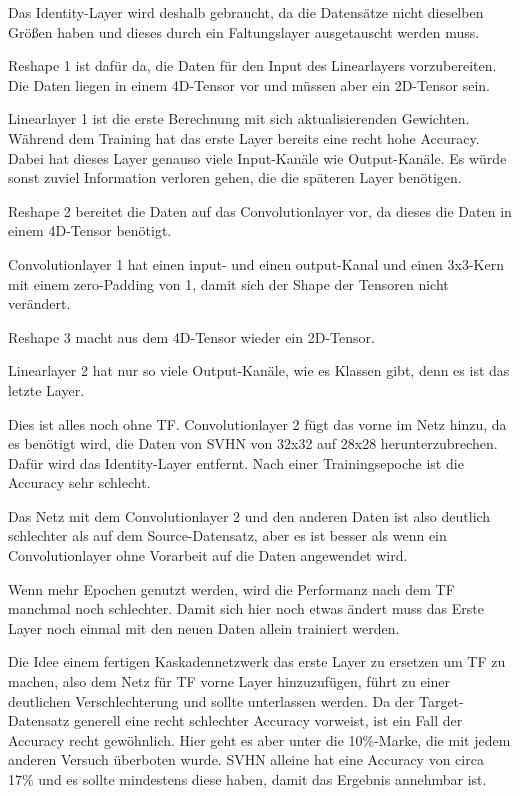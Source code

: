     Das Identity-Layer wird deshalb gebraucht, da die Datensätze nicht 
    dieselben Größen haben und dieses durch ein Faltungslayer ausgetauscht 
    werden muss.

    Reshape 1 ist dafür da, die Daten für den Input des Linearlayers vorzubereiten. 
    Die Daten liegen in einem 4D-Tensor vor und müssen aber ein 2D-Tensor sein. 

    Linearlayer 1 ist die erste Berechnung mit sich aktualisierenden Gewichten. 
    Während dem Training hat das erste Layer bereits eine recht hohe Accuracy. 
    Dabei hat dieses Layer genauso viele Input-Kanäle wie Output-Kanäle. 
    Es würde sonst zuviel Information verloren gehen, die die späteren Layer benötigen.

    Reshape 2 bereitet die Daten auf das Convolutionlayer vor, da dieses die Daten 
    in einem 4D-Tensor benötigt.

    Convolutionlayer 1 hat einen input- und einen output-Kanal und einen 3x3-Kern 
    mit einem zero-Padding von 1, damit sich der Shape der Tensoren nicht verändert. 

    Reshape 3 macht aus dem 4D-Tensor wieder ein 2D-Tensor.

    Linearlayer 2 hat nur so viele Output-Kanäle, wie es Klassen gibt, denn es 
    ist das letzte Layer. 

    Dies ist alles noch ohne TF.
    Convolutionlayer 2 fügt das vorne im Netz hinzu, da es benötigt wird, die 
    Daten von SVHN von 32x32 auf 28x28 herunterzubrechen. Dafür wird das Identity-Layer 
    entfernt. Nach einer Trainingsepoche ist die Accuracy sehr schlecht.

    Das Netz mit dem Convolutionlayer 2 und den anderen Daten ist also deutlich schlechter 
    als auf dem Source-Datensatz, aber es ist besser als wenn ein Convolutionlayer ohne Vorarbeit 
    auf die Daten angewendet wird.

    Wenn mehr Epochen genutzt werden, wird die Performanz nach dem TF manchmal 
    noch schlechter. Damit sich hier noch etwas ändert muss das Erste Layer noch 
    einmal mit den neuen Daten allein trainiert werden.

    Die Idee einem fertigen Kaskadennetzwerk das erste Layer zu ersetzen um TF zu machen, also 
    dem Netz für TF vorne Layer hinzuzufügen, führt zu einer deutlichen Verschlechterung und sollte 
    unterlassen werden. Da der Target-Datensatz generell eine recht schlechter Accuracy 
    vorweist, ist ein Fall der Accuracy recht gewöhnlich. Hier geht es aber unter die 10\%-Marke, 
    die mit jedem anderen Versuch überboten wurde. SVHN alleine hat eine Accuracy von circa 17\% und 
    es sollte mindestens diese haben, damit das Ergebnis annehmbar ist.

